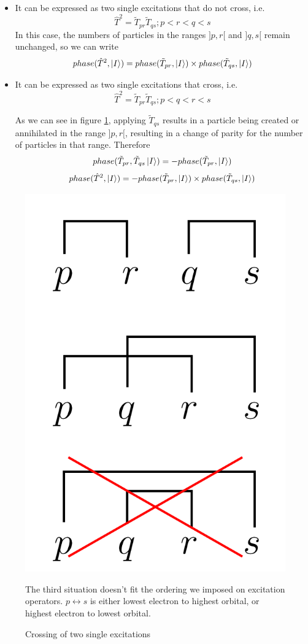\documentclass[./thesis.tex]{subfiles}
\begin{document}
\begin{itemize}
\item
It can be expressed as two single excitations that do not cross, i.e.
$$\hat T^2=\tilde T_{pr} \tilde T_{qs};p<r<q<s$$
In this case, the numbers of particles in the ranges $]p, r[$ and $]q, s[$ remain unchanged, so we can write
$$phase(\hat T^2, \ket I) = phase(\tilde T_{pr}, \ket I) \times phase(\tilde T_{qs}, \ket I) $$

\item
It can be expressed as two single excitations that cross, i.e.
$$\hat T^2=\tilde T_{pr} \tilde T_{qs};p<q<r<s$$


As we can see in figure \ref{fig:biphasefactor}, applying  $\tilde T_{qs}$ results in a particle being created or annihilated in the range $]p,r[$, resulting in a change of parity for the number of particles in that range. Therefore
$$phase(\tilde T_{pr}, \tilde T_{qs} \ket I) = -phase(\tilde T_{pr}, \ket I)$$ 
$$phase(\hat T^2, \ket I) = -phase(\tilde T_{pr}, \ket I) \times phase(\tilde T_{ qs}, \ket I) $$

\end{itemize}



\begin{figure}[h!]
	\begin{center}
		\includegraphics[width=0.4\columnwidth]{figures/determinant_driven/biphasefactor}
		\caption{
		\label{fig:biphasefactor}%
		Crossing of two single excitations
		}
		The third situation doesn't fit the ordering we imposed on excitation operators. $p \leftrightarrow s$ is either lowest electron to highest orbital, or highest electron to lowest orbital.
	\end{center}
\end{figure}
\end{document}
